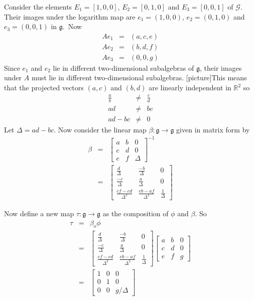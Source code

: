 \documentclass[honours]{UNSWthesis}
\newcommand{\R}{\mathbb{R}}
\newcommand{\G}{\mathcal{G}}
\newcommand{\g}{\mathfrak{g}}
\newcommand{\1}{\mathbf{e}_{1}}
\newcommand{\2}{\mathbf{e}_{3}}
\newcommand{\3}{\mathbf{e}_{3}}
\begin{document}
Consider the elements $E_{1}=[1,0,0]$, $E_{2}=[0,1,0]$ and $E_{3}=[0,0,1]$ of $\G$. Their images under the logarithm map are $e_{1}=(1,0,0)$, $e_{2}=(0,1,0)$ and $e_{3}=(0,0,1)$ in $\g$.\
Now
\begin{eqnarray*}
Ae_{1} &=& (a,c,e) \\
Ae_{2} &=& (b,d,f) \\
Ae_{3} &=& (0,0,g)
\end{eqnarray*}
Since $e_{1}$ and $e_{2}$ lie in different two-dimensional subalgebras of $\g$, their images under $A$ must lie in different two-dimensional subalgebras. [picture]This means that the projected vectors $(a,c)$ and $(b,d)$ are linearly independent in $\R^{2}$ so 
\begin{eqnarray*}
\frac{a}{b} &\neq & \frac{c}{d} \\
ad &\neq & bc\\
ad-bc &\neq & 0 
\end{eqnarray*} Let $\Delta = ad-bc$.
Now consider the linear map $\beta:\g \longrightarrow \g$ given in matrix form by 
\begin{eqnarray*}
\beta &=& \begin{bmatrix}
a & b & 0 \\
c & d & 0 \\
e & f & \Delta
\end{bmatrix}^{-1} \\
&=& \begin{bmatrix}
\frac{d}{\Delta} & \frac{-b}{\Delta} & 0 \\
\frac{-c}{\Delta} & \frac{a}{\Delta} & 0 \\
\frac{cf-ed}{\Delta^{2}} & \frac{eb-af}{\Delta^{2}} & \frac{1}{\Delta}
\end{bmatrix}
\end{eqnarray*}

Now define a new map $\tau: \g \longrightarrow \g$ as the composition of $\phi$ and $\beta$. So 
\begin{eqnarray*}
\tau &=& \beta_{o} \phi \\
&=& \begin{bmatrix}
\frac{d}{\Delta} & \frac{-b}{\Delta} & 0 \\
\frac{-c}{\Delta} & \frac{a}{\Delta} & 0 \\
\frac{cf-ed}{\Delta^{2}} & \frac{eb-af}{\Delta^{2}} & \frac{1}{\Delta}
\end{bmatrix}
\begin{bmatrix}
a & b & 0 \\
c & d & 0 \\
e & f & g
\end{bmatrix} \\
&=& 
\begin{bmatrix}
1 & 0 & 0 \\
0 & 1 & 0 \\
0 & 0 & g/\Delta
\end{bmatrix}
\end{eqnarray*}
\end{document}
